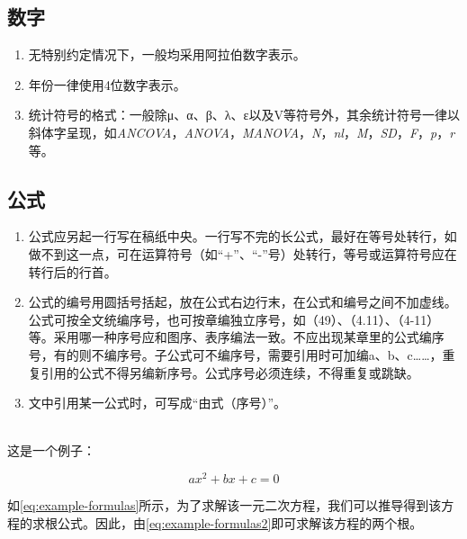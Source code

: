 \subsection{数字}

\begin{enumerate}
    \item 无特别约定情况下，一般均采用阿拉伯数字表示。
    \item 年份一律使用4位数字表示。
    \item 统计符号的格式：一般除μ、α、β、λ、ε以及V等符号外，其余统计符号一律以斜体字呈现，如\textit{ANCOVA}，\textit{ANOVA}，\textit{MANOVA}，\textit{N}，\textit{nl}，\textit{M}，\textit{SD}，\textit{F}，\textit{p}，\textit{r}等。
\end{enumerate}


\subsection{公式}

\begin{enumerate}
    \item 公式应另起一行写在稿纸中央。一行写不完的长公式，最好在等号处转行，如做不到这一点，可在运算符号（如``+''、``-''号）处转行，等号或运算符号应在转行后的行首。
    \item 公式的编号用圆括号括起，放在公式右边行末，在公式和编号之间不加虚线。公式可按全文统编序号，也可按章编独立序号，如（49）、（4.11）、（4-11）等。采用哪一种序号应和图序、表序编法一致。不应出现某章里的公式编序号，有的则不编序号。子公式可不编序号，需要引用时可加编a、b、c……，重复引用的公式不得另编新序号。公式序号必须连续，不得重复或跳缺。
    \item 文中引用某一公式时，可写成``由式（序号）''。
\end{enumerate}

\ \\

这是一个例子：

\begin{equation}
    \label{eq:example-formulas}
    ax^2 +bx+c = 0
\end{equation}


如\autoref{eq:example-formulas}所示，为了求解该一元二次方程，我们可以推导得到该方程的求根公式。因此，由\autoref{eq:example-formulas2}即可求解该方程的两个根。

